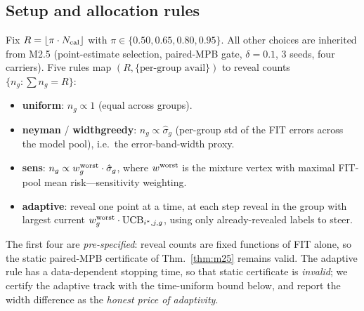 \documentclass{article}
\begin{document}
\subsection{Setup and allocation rules}
Fix $R=\lfloor \pi \cdot N_{\rm cal}\rfloor$ with $\pi\in\{0.50,0.65,0.80,0.95\}$. All other
choices are inherited from M2.5 (point-estimate selection, paired-MPB gate, $\delta{=}0.1$,
3 seeds, four carriers). Five rules map $(R,\{\text{per-group avail}\})$ to reveal counts
$\{n_g:\sum n_g=R\}$:
\begin{itemize}
\item \textbf{uniform}: $n_g\propto 1$ (equal across groups).
\item \textbf{neyman} / \textbf{widthgreedy}: $n_g\propto \hat\sigma_g$ (per-group std of the
FIT errors across the model pool), i.e.\ the error-band-width proxy.
\item \textbf{sens}: $n_g\propto w^{\rm worst}_g \cdot \hat\sigma_g$, where $w^{\rm worst}$ is
the mixture vertex with maximal FIT-pool mean risk---sensitivity weighting.
\item \textbf{adaptive}: reveal one point at a time, at each step reveal in the group with
largest current $w^{\rm worst}_{g}\cdot\mathrm{UCB}_{i^*,j,g}$, using only already-revealed
labels to steer.
\end{itemize}
The first four are \emph{pre-specified}: reveal counts are fixed functions of FIT alone, so
the static paired-MPB certificate of Thm.~\ref{thm:m25} remains valid. The adaptive rule has
a data-dependent stopping time, so that static certificate is \emph{invalid}; we certify the
adaptive track with the time-uniform bound below, and report the width difference as the
\emph{honest price of adaptivity}.
\end{document}
